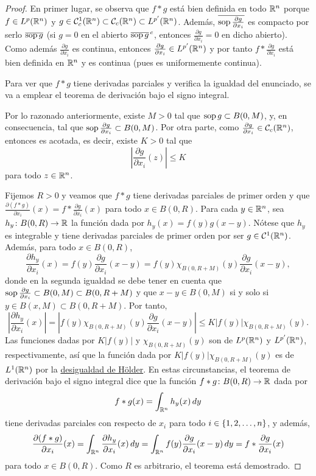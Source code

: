 \documentclass[a4paper, 11pt, oneside]{report}
\begin{document}
\begin{proof}
  En primer lugar, se observa que $f \ast g$ está bien definida en todo $\mathbb R^n$ porque $f \in L^p(\mathbb R^n)$ y $g \in \mathcal{C}^1_c(\mathbb R^n) \subset \mathcal{C}_c(\mathbb R^n) \subset L^{p'}(\mathbb R^n)$. Además, $\overline{\textup{sop}\, \frac{\partial g}{\partial x_i}}$ es compacto por serlo $\overline{\textup{sop}\, g}$ (si $g = 0$ en el abierto $\overline{\textup{sop}\, g}^{\, c}$, entonces $\frac{\partial g}{\partial x_i} = 0$ en dicho abierto). Como además $\frac{\partial g}{\partial x_i}$ es continua, entonces $\frac{\partial g}{\partial x_i} \in L^{p'}(\mathbb R^n)$ y por tanto $f \ast \frac{\partial g}{\partial x_i}$ está bien definida en $\mathbb R^n$ y es continua (pues es uniformemente continua). 

  Para ver que $f \ast g$ tiene derivadas parciales y verifica la igualdad del enunciado, se va a emplear el teorema de derivación bajo el signo integral.

  Por lo razonado anteriormente, existe $M >0$ tal que $\textup{sop}\, g \subset B(0,M)$, y, en consecuencia, tal que $\textup{sop}\, \frac{\partial g}{\partial x_i} \subset B(0,M)$. Por otra parte, como $\frac{\partial g}{\partial x_i} \in \mathcal{C}_c(\mathbb R^n)$, entonces es acotada, es decir, existe $K>0$ tal que
  \[\left|\frac{\partial g}{\partial x_i}(z)\right| \leq K\]
  para todo $z \in \mathbb R^n$.

  Fijemos $R>0$ y veamos que $f \ast g$ tiene derivadas parciales de primer orden y que $\frac{\partial (f \ast g)}{\partial x_i}(x) = f \ast \frac{\partial g}{\partial x_i}(x)$ para todo $x \in B(0,R)$. Para cada $y \in \mathbb R^n$, sea $h_y \colon B(0,R) \to \mathbb R$ la función dada por $h_y(x)= f(y)g(x-y)$. Nótese que $h_y$ es integrable y tiene derivadas parciales de primer orden por ser $g \in \mathcal{C}^1(\mathbb R^n)$. Además, para todo $x \in B(0,R)$,
  \[\frac{\partial h_y}{\partial x_i}(x)= f(y)\frac{\partial g}{\partial x_i}(x-y) = f(y)\chi_{B(0,R+M)}(y)\frac{\partial g}{\partial x_i}(x-y), \]
  donde en la segunda igualdad se debe tener en cuenta que $\textup{sop}\, \frac{\partial g}{\partial x_i} \subset B(0,M) \subset B(0,R+M)$ y que $x-y \in B(0,M)$ si y solo si $y \in B(x,M) \subset B(0,R+M)$. Por tanto,
  \[\left|\frac{\partial h_y}{\partial x_i}(x)\right| = \left| f(y)\chi_{B(0,R+M)}(y)\frac{\partial g}{\partial x_i}(x-y)\right| \leq K |f(y)| \chi_{B(0,R+M)}(y).\]
  Las funciones dadas por $K|f(y)|$ y $\chi_{B(0,R+M)}(y)$ son de $L^p(\mathbb R^n)$ y $L^{p'}(\mathbb R^n)$, respectivamente, así que la función dada por $K|f(y)|\chi_{B(0,R+M)}(y)$ es de $L^1(\mathbb R^n)$ por la \hyperref[cor:1.4.4]{\color{c1}desigualdad de Hölder}. En estas circunstancias, el teorema de derivación bajo el signo integral dice que la función $f \ast g \colon B(0,R) \to \mathbb R$ dada por
  \[f \ast g(x)=\int_{\mathbb R^n} h_y(x) \, dy\]
  tiene derivadas parciales con respecto de $x_i$ para todo $i \in \{1,2,\mathellipsis,n\}$, y además,
  \[\frac{\partial (f \ast g)}{\partial x_i}(x)=\int_{\mathbb R^n} \frac{\partial h_y}{\partial x_i}(x) \, dy = \int_{\mathbb R^n} f(y)\frac{\partial g}{\partial x_i} (x-y) \, dy = f \ast \frac{\partial g}{\partial x_i}(x)\]
  para todo $x \in B(0,R)$. Como $R$ es arbitrario, el teorema está demostrado.
\end{proof}
\end{document}

